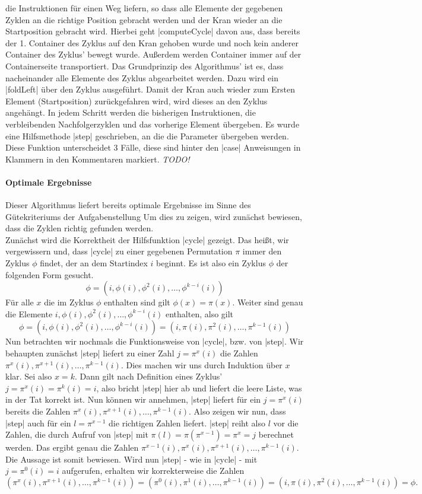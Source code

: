 die Instruktionen für einen Weg liefern, so dass alle Elemente der gegebenen Zyklen an die richtige Position gebracht werden und
der Kran wieder an die Startposition gebracht wird.
Hierbei geht |computeCycle| davon aus, dass bereits der 1. Container des Zyklus auf den Kran gehoben wurde und noch kein anderer Container des Zyklus' bewegt wurde.
Außerdem werden Container immer auf der Containerseite transportiert.
Das Grundprinzip des Algorithmus' ist es, dass nacheinander alle Elemente des Zyklus abgearbeitet werden.
Dazu wird ein |foldLeft| über den Zyklus ausgeführt.
Damit der Kran auch wieder zum Ersten Element (Startposition) zurückgefahren wird, wird dieses an den Zyklus angehängt.
In jedem Schritt werden die bisherigen Instruktionen, die verbleibenden Nachfolgerzyklen und das vorherige Element übergeben.
Es wurde eine Hilfsmethode |step| geschrieben, an die die Parameter übergeben werden. \\
Diese Funktion unterscheidet 3 Fälle, diese sind hinter den |case| Anweisungen in Klammern in den Kommentaren markiert.
\emph{TODO!}

\paragraph{Optimale Ergebnisse}
\label{opt_res}
Dieser Algorithmus liefert bereits optimale Ergebnisse im Sinne des Gütekriteriums der Aufgabenstellung
Um dies zu zeigen, wird zunächst bewiesen, dass die Zyklen richtig gefunden werden. \\

Zunächst wird die Korrektheit der Hilfsfunktion |cycle| gezeigt.
Das heißt, wir vergewissern und, dass |cycle| zu einer gegebenen Permutation $\pi$ immer den Zyklus $\phi$ findet, der an dem Startindex $i$ beginnt.
Es ist also ein Zyklus $\phi$ der folgenden Form gesucht.
\[ \phi = (i, \phi(i),\phi^2(i), \dots, \phi^{k-i}(i)) \]
Für alle $x$ die im Zyklus $\phi$ enthalten sind gilt $\phi(x) = \pi(x)$.
Weiter sind genau die Elemente $i, \phi(i),\phi^2(i), \dots, \phi^{k-i}(i)$ enthalten, also gilt
\[ \phi = (i, \phi(i),\phi^2(i), \dots, \phi^{k-i}(i)) = (i, \pi(i),\pi^2(i), \dots, \pi^{k-1}(i)) \]
Nun betrachten wir nochmals die Funktionsweise von |cycle|, bzw. von |step|.
Wir behaupten zunächst |step| liefert zu einer Zahl $j = \pi^x(i)$ die Zahlen $\pi^x(i), \pi^{x+1}(i), \dots, \pi^{k-1}(i)$.
Dies machen wir uns durch Induktion über $x$ klar. Sei also $x = k$.
Dann gilt nach Definition eines Zyklus' $j = \pi^x(i) = \pi^k(i) = i$, also bricht |step| hier ab und liefert die leere Liste, was in der Tat korrekt ist.
Nun können wir annehmen, |step| liefert für ein $j = \pi^x(i)$ bereits die Zahlen $\pi^x(i), \pi^{x+1}(i), \dots, \pi^{k-1}(i)$.
Also zeigen wir nun, dass |step| auch für ein $l = \pi^{x-1}$ die richtigen Zahlen liefert.
|step| reiht also $l$ vor die Zahlen, die durch Aufruf von |step| mit $\pi(l) = \pi(\pi^{x-1}) = \pi^x = j$ berechnet werden.
Das ergibt genau die Zahlen $\pi^{x-1}(i), \pi^x(i), \pi^{x+1}(i), \dots, \pi^{k-1}(i)$.
Die Aussage ist somit bewiesen.
Wird nun |step| - wie in |cycle| - mit $j = \pi^0(i) = i$ aufgerufen, erhalten wir korrekterweise die Zahlen
\[ (\pi^x(i), \pi^{x+1}(i), \dots, \pi^{k-1}(i)) = (\pi^0(i), \pi^1(i), \dots, \pi^{k-1}(i)) = (i, \pi(i), \pi^2(i), \dots, \pi^{k-1}(i)) = \phi.\]

